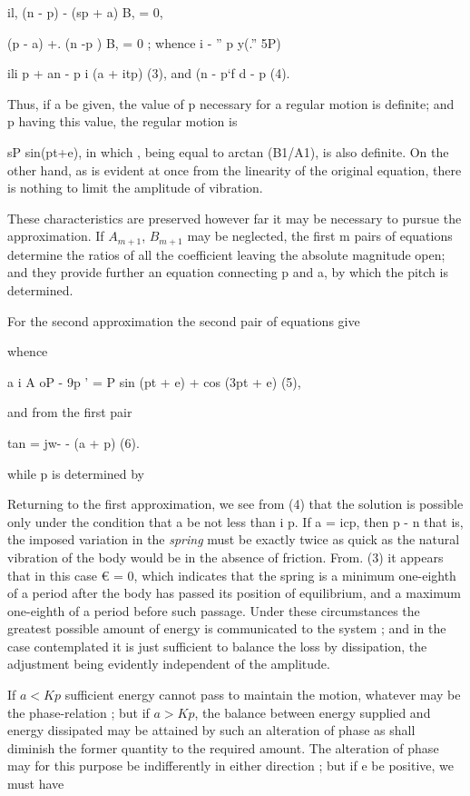 il, (n - p) - (sp + a) B, = 0,

(p - a) +. (n -p ) B, = 0 ; whence i - '' p y(.'' 5P)

ili p + an - p i (a + itp) (3),
and (n - p`f d - p (4).

Thus, if a be given, the value of p necessary for a regular
motion is definite; and p having this value, the regular motion is

sP sin(pt+e),
in which , being equal to arctan (B1/A1), is also definite.  On the
other hand, as is evident at once from the linearity of the original
equation, there is nothing to limit the amplitude of vibration.

These characteristics are preserved however far it may be
necessary to pursue the approximation. If
\(A_{m+1}\),
\(B_{m+1}\) may be
neglected, the first m pairs of equations determine the ratios of all
the coefficient leaving the absolute magnitude open; and they
provide further an equation connecting p and a, by which the
pitch is determined.

For the second approximation the second pair of equations
give

whence

a i A oP - 9p ' = P sin (pt + e) + cos (3pt + e) (5),

and from the first pair

tan = jw- - (a + p) (6).

while p is determined by

Returning to the first approximation, we see from (4) that the solution
is possible only under the condition that a be not less than i p. If a =
icp, then p - n that is, the imposed variation in the \emph{spring} must
be exactly twice as quick as the natural vibration of the body would be
in the absence of friction. From. (3) it appears that in this case € =
0, which indicates that the spring is a minimum one-eighth of a period
after the body has passed its position of equilibrium, and a maximum
one-eighth of a period before such passage. Under these circumstances
the greatest possible amount of energy is communicated to the system ;
and in the case contemplated it is just sufficient to balance the loss
by dissipation, the adjustment being evidently independent of the
amplitude.

If \( a <  Kp \) sufficient energy cannot pass to maintain the motion, whatever
may be the phase-relation ; but if \( a > Kp \), the balance
between energy
supplied and energy dissipated may be attained by such an alteration of
phase as shall diminish the former quantity to the required amount. The
alteration of phase may for this purpose be indifferently in either
direction ; but if e be positive, we must have

